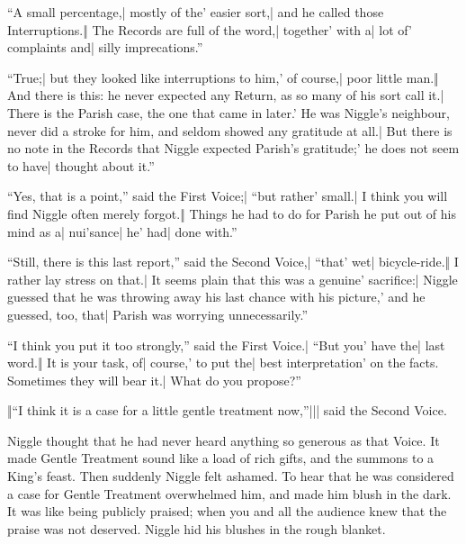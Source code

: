 \begin{itemize}
\halfone “A small percentage,| mostly of the' easier sort,| and he called those Interruptions.‖ The Records are full of the word,| together' with a| lot of' complaints and| silly imprecations.”
\end{itemize}

\begin{itemize}
\halftwo “True;| but they looked like interruptions to him,' of course,| poor little man.‖ And there is this: he never expected any Return, as so many of his sort call it.| There is the Parish case, the one that came in later.' He was Niggle’s neighbour, never did a stroke for him, and seldom showed any gratitude at all.| But there is no note in the Records that Niggle expected Parish’s gratitude;' he does not seem to have| thought about it.”
\end{itemize}


\begin{itemize}
\halfone “Yes, that is a point,” said the First Voice;| “but rather' small.| I think you will find Niggle often merely forgot.‖ Things he had to do for Parish he put out of his mind as a| nui'sance| he' had| done with.”
\end{itemize}

\begin{itemize}
\halftwo “Still, there is this last report,” said the Second Voice,| “that' wet| bicycle-ride.‖ I rather lay stress on that.| It seems plain that this was a genuine' sacrifice:| Niggle guessed that he was throwing away his last chance with his picture,' and he guessed, too, that| Parish was worrying unnecessarily.”
\end{itemize}

\begin{itemize}
\halfone “I think you put it too strongly,” said the First Voice.| “But you' have the| last word.‖ It is your task, of| course,' to put the| best interpretation' on the facts. Sometimes they will bear it.| What do you propose?”
\end{itemize}

\begin{itemize}
\quarterfour ‖“I think it is a case for a little gentle treatment now,”||| said the Second Voice.
\end{itemize}

Niggle thought that he had never heard anything so generous as that Voice. It made Gentle Treatment sound like a load of rich gifts, and the summons to a King’s feast. Then suddenly Niggle felt ashamed. To hear that he was considered a case for Gentle Treatment overwhelmed him, and made him blush in the dark. It was like being publicly praised; when you and all the audience knew that the praise was not deserved. Niggle hid his blushes in the rough blanket.

